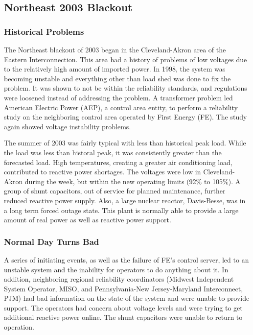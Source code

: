\subsection{Northeast 2003 Blackout} 


\subsubsection{Historical Problems}
The Northeast blackout of 2003 began in the Cleveland-Akron area of the Eastern Interconnection.  This area had a history of problems of low voltages due to the relatively high amount of imported power.  In 1998, the system was becoming unstable and everything other than load shed was done to fix the problem.  It was shown to not be within the reliability standards, and regulations were loosened instead of addressing the problem.  A transformer problem led American Electric Power (AEP), a control area entity, to perform a reliability study on the neighboring control area operated by First Energy (FE).  The study again showed voltage instability problems.

The summer of 2003 was fairly typical with less than historical peak load.  While the load was less than historal peak, it was consistently greater than the forecasted load.  High temperatures, creating a greater air conditioning load, contributed to reactive power shortages.  The voltages were low in Cleveland-Akron during the week, but within the new operating limits (92\% to 105\%).  A group of shunt capacitors, out of service for planned maintenance, further reduced reactive power supply.  Also, a large nuclear reactor, Davis-Besse, was in a long term forced outage state.  This plant is normally able to provide a large amount of real power as well as reactive power support.

\subsubsection{Normal Day Turns Bad}
A series of initiating events, as well as the failure of FE's control server, led to an unstable system and the inability for operators to do anything about it.  In addition, neighboring regional reliability coordinators (Midwest Independent System Operator, MISO, and Pennsylvania-New Jersey-Maryland Interconnect, PJM) had bad information on the state of the system and were unable to provide support.  The operators had concern about voltage levels and were trying to get additional reactive power online.  The shunt capacitors were unable to return to operation.

